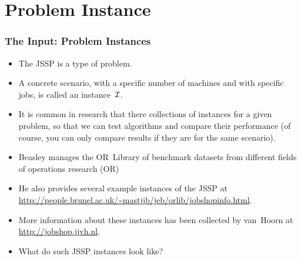 \documentclass[mathserif]{beamer}%
\begin{document}
\section{Problem Instance}%
%
\begin{frame}%
\frametitle{The Input: Problem Instances}%
\begin{itemize}%
\item The JSSP is a \alert<2>{type} of problem.%
\item<2-> A concrete scenario, with a specific number of machines and with specific jobs, is called an \mbox{\alert<2>{instance~$\mathcal{I}$}}.%
\item<3-> It is common in research that there collections of instances for a given problem, so that we can test algorithms and compare their performance (of course, you can only compare results if they are for the same scenario).%
\item<4-> \mbox{Beasley\cite{B1990OLDTPBEM}} manages the \alert{OR~Library} of benchmark datasets from different fields of operations research (OR)%
\item<5-> He also provides several example instances of the JSSP at \url{http://people.brunel.ac.uk/~mastjjb/jeb/orlib/jobshopinfo.html}.%
\item<6-> More information about these instances has been collected by \mbox{van Hoorn\cite{vH2015JSIAS,vH2018TCSOBOBIOTJSSP}} at \url{http://jobshop.jjvh.nl}.
\item<7-> What do such JSSP instances look like?%
\end{itemize}%
\end{frame}%
%
\end{document}
